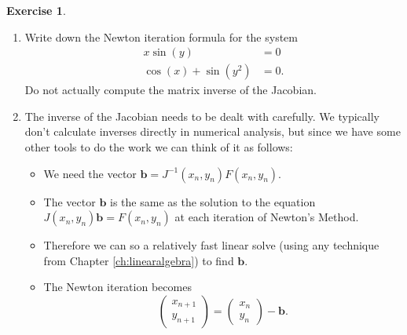 \documentclass[
]{book}
\theoremstyle{definition}
\theoremstyle{definition}
\theoremstyle{definition}
\newtheorem{exercise}{Exercise}[chapter]
\theoremstyle{remark}
\begin{document}
\begin{exercise}
\begin{enumerate}
\begin{enumerate}
\[\begin{pmatrix}
              x_n \\ y_n \end{pmatrix} - J^{-1}(x_n,y_n) F(x_n, y_n).\]
    Writing this in full matrix-vector form we get
    \[\begin{pmatrix} x_{n+1} \\ y_{n+1} \end{pmatrix} = \begin{pmatrix}
                  x_n \\ y_n \end{pmatrix} - \begin{pmatrix} f_x & f_y \\ g_x & g_y
          \end{pmatrix}^{-1} \begin{pmatrix} f(x_n,y_n) \\ g(x_n,y_n) \end{pmatrix}.\]
  \end{enumerate}
\item
  Write down the Newton iteration formula for the system
  \[\begin{aligned}
          x\sin(y) &= 0 \\
          \cos(x) + \sin(y^2) &= 0.
      \end{aligned}\] Do not actually compute the matrix inverse of
  the Jacobian.
\item
  The inverse of the Jacobian needs to be dealt with carefully. We
  typically don't calculate inverses directly in numerical analysis,
  but since we have some other tools to do the work we can think of it
  as follows:

  \begin{itemize}
  \item
    We need the vector \(\boldsymbol{b} = J^{-1}(x_n,y_n) F(x_n,y_n)\).
  \item
    The vector \(\boldsymbol{b}\) is the same as the solution to the equation
    \(J(x_n,y_n) \boldsymbol{b}  = F(x_n,y_n)\) at each iteration of Newton's Method.
  \item
    Therefore we can so a relatively fast linear solve (using any
    technique from Chapter \ref{ch:linearalgebra}) to find \(\boldsymbol{b}\).
  \item
    The Newton iteration becomes
    \[\begin{pmatrix} x_{n+1} \\ y_{n+1} \end{pmatrix} = \begin{pmatrix} x_n \\
                    y_n \end{pmatrix} - \boldsymbol{b}.\]
  \end{itemize}
\end{enumerate}
\end{exercise}
\end{document}
